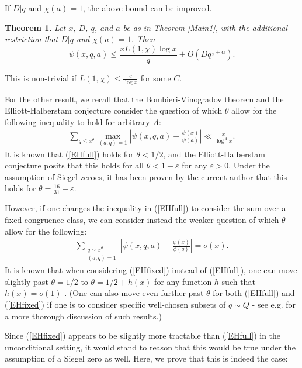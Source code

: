 \documentclass{amsart}
\newtheorem{theorem}{Theorem}[section]
\begin{document}
If $D|q$ and $\chi(a)=1$, the above bound can be improved.
\begin{theorem}\label{Main1.5}
Let $x$, $D$, $q$, and $a$ be as in Theorem \ref{Main1}, with the additional restriction that $D|q$ and $\chi(a)=1$.   Then
$$\psi(x,q,a)\leq \frac{xL(1,\chi)\log x}{q}+O\left(Dq^{\frac 12+\alpha}\right).$$
\end{theorem}
This is non-trivial if $L(1,\chi)\leq \frac{c}{\log x}$ for some $C$.

For the other result, we recall that the Bombieri-Vinogradov theorem and the Elliott-Halberstam conjecture consider the question of which $\theta$ allow for the following inequality to hold for arbitrary $A$:
\begin{gather}\label{EHfull}\sum_{q\leq x^\theta}\max_{(a,q)=1}\left|\psi(x,q,a)-\frac{\psi(x)}{\psi(a)}\right|\ll \frac{x}{\log^A x}.
\end{gather}
It is known that (\ref{EHfull}) holds for $\theta<1/2$, and the Elliott-Halberstam conjecture posits that this holds for all $\theta<1-\varepsilon$ for any $\varepsilon>0$.  Under the assumption of Siegel zeroes, it has been proven by the current author \cite{WrSiAP} that this holds for $\theta=\frac{16}{31}-\varepsilon$.

However, if one changes the inequality in (\ref{EHfull}) to consider the sum over a fixed congruence class, we can consider instead the weaker question of which $\theta$ allow for the following:
\begin{gather}\label{EHfixed}\sum_{\substack{q\sim x^\theta \\ (a,q)=1}}\left|\psi(x,q,a)-\frac{\psi(x)}{\phi(q)}\right|=o\left(x\right).
\end{gather}
It is known that when considering (\ref{EHfixed}) instead of (\ref{EHfull}), one can move slightly past $\theta=1/2$ to $\theta=1/2+h(x)$ for any function $h$ such that $h(x)=o(1)$ \cite{BFI}. (One can also move even further past $\theta$ for both (\ref{EHfull}) and (\ref{EHfixed}) if one is to consider specific well-chosen subsets of $q\sim Q$ - see e.g. \cite{MaWF1} for a more thorough discussion of such results.)

Since (\ref{EHfixed}) appears to be slightly more tractable than (\ref{EHfull}) in the unconditional setting, it would stand to reason that this would be true under the assumption of a Siegel zero as well.  Here, we prove that this is indeed the case:
\end{document}
